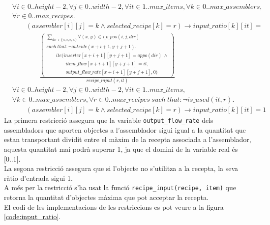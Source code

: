 \begin{align*}
    &\forall i \in 0..height-2, \forall j \in 0..width-2, \forall it \in 1..max\_items, \forall k \in 0..max\_assemblers,\\
    & \forall r \in 0..max\_recipes.\\
    &\qquad (assembler[i][j]=k \land selected\_recipe[k]=r)\rightarrow input\_ratio[k][it]=\\ 
    &\qquad \qquad \frac{
        \left(\begin{array}{l}
        \sum_{dir\in\{n,s,e,w\}} \forall (x,y)\in i\_o\_pos(i,j,dir)\\
        such \ that: \lnot outside(x+i+1, y+j+1).\\
        \qquad ite\Big(inserter[x+i+1][y+j+1]=oppo(dir) \ \land\\
        \qquad \qquad item\_flow[x+i+1][y+j+1]=it,\\
        \qquad \qquad output\_flow\_rate[x+i+1][y+j+1], 0\Big)
        \end{array}\right)
    }{recipe\_input(r,it)}
\end{align*}
\begin{align*}
    &\forall i \in 0..height-2, \forall j \in 0..width-2, \forall it \in 1..max\_items,\\
    &\forall k \in 0..max\_assemblers, \forall r \in 0..max\_recipes \ such \ that: \lnot is\_used(it, r).\\
    &\qquad (assembler[i][j]=k \land selected\_recipe[k]=r)\rightarrow input\_ratio[k][it]=1
\end{align*}
La primera restricció assegura que la variable \lstinline{output_flow_rate} dels assembladors que aporten objectes a l'assemblador sigui igual a la quantitat que estan transportant dividit entre el màxim de la recepta associada a l'assemblador, aquesta quantitat mai podrà superar 1, ja que el domini de la variable real és [0..1].\\
La segona restricció assegura que si l'objecte no s'utilitza a la recepta, la seva ràtio d'entrada sigui 1.\\
A més per la restricció s'ha usat la funció \lstinline{recipe_input(recipe, item)} que retorna la quantitat d'objectes màxima que pot acceptar la recepta.\\
El codi de les implementacions de les restriccions es pot veure a la figura \ref{code:input_ratio}.


